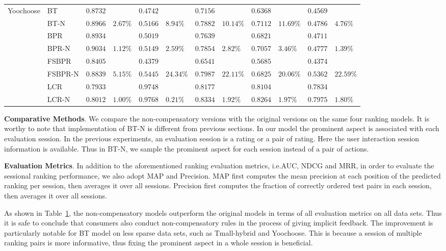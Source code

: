 \documentclass[letterpaper]{article} %
\begin{document}
\begin{table}[ht]
\begin{center}
\begin{tabular}{p{1.2cm}<{\centering}|p{1.2cm}<{\centering} |p{0.5cm} p{0.6cm} |p{0.5cm} p{0.6cm} |p{0.5cm} p{0.6cm}|p{0.5cm} p{0.6cm} |p{0.5cm} p{0.6cm}}
	\hline
\multirow{6}{*}{Yoochoose}	&BT	& $0.8732 $&  &$0.4742$& &$0.7156$&   &$0.6368$& 	& $0.4569$ 	&\\
	&BT-N	&$0.8966$ &	$2.67\%$	&$0.5166 $	&$8.94\%$	&$0.7882$ &	$10.14\%$	&$0.7112$ &	$11.69\%$	&$0.4786 $	&$4.76\%$\\
	&BPR&	$0.8934$ 	&&	$0.5019$ 	&&	$0.7639$ & &$0.6821$& 	& $0.4711$ 	&\\
	&BPR-N	&$0.9034$ 	&$1.12\%$	&$0.5149$ &	$2.59\%$	&$0.7854$ 	&$2.82\%$ &$0.7057$ &	$3.46\%$	&$0.4777 $	&$1.39\%$	\\
	&FSBPR		&$0.8405$&	&$0.4379$ 	&&	$0.6541$& &$0.5685$& 	& $0.4374$ 	&\\	
	&FSBPR-N	&$0.8839$	&$5.15\%$	&	$0.5445$ 	&$24.34\%$	&$0.7987$ 	&$22.11\%$ &$0.6825$ &	$20.06\%$	&$0.5362 $	&$22.59\%$	\\
	&LCR		&$0.7933$&	&$0.9748$ 	&&	$0.8177$& &$0.8104$& 	& $0.7834$ 	&\\	
	&LCR-N	&$0.8012$	&$1.00\%$	&	$0.9768$ 	&$0.21\%$	&$0.8334$ 	&$1.92\%$ &$0.8264$ &	$1.97\%$	&$0.7975 $	&$1.80\%$\\
	\hline
	\end{tabular}
\end{center}
\label{tab:gradedresult}
\end{table}%

\textbf{Comparative Methods}. We compare the non-compensatory versions with the original versions on the same four ranking models. It is worthy to note that implementation of BT-N is different from previous sections.  In our model the prominent aspect is associated with each evaluation session. In the previous experiments, an evaluation session is a rating or a pair of rating. Here the user interaction session information is available. Thus in BT-N, we sample the prominent aspect for each session instead of a pair of actions.  

\textbf{Evaluation Metrics}.  In addition to the aforementioned  ranking evaluation metrics, i.e.AUC, NDCG and MRR, in order to evaluate the sessional ranking performance, we also adopt  MAP and Precision. MAP first computes the mean precision at each position of the predicted ranking per session, then averages it over all sessions. Precision first computes the fraction of correctly ordered test pairs in each session, then averages it over all sessions. 

As shown in Table~\ref{tab:gradedresult}, the non-compensatory models outperform the original models in terms of all evaluation metrics on all data sets. Thus it is safe to conclude that consumers also conduct non-compensatory rules in the process of giving implicit feedback. The improvement is particularly notable for BT model on less sparse data sets, such as Tmall-hybrid and Yoochoose. This is because a session of multiple ranking pairs is more informative, thus fixing the prominent aspect in a whole session is beneficial.
\end{document}
